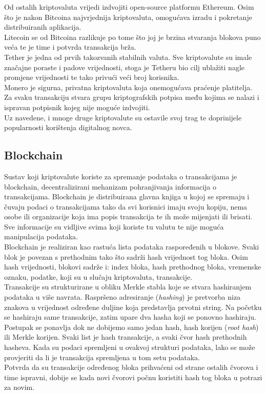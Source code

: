 \documentclass[12pt]{article}
\begin{document}
Od ostalih kriptovaluta vrijedi izdvojiti open-source platformu Ethereum. Osim što je nakon Bitcoina najvrjednija kriptovaluta, omogućava izradu i pokretanje distribuiranih aplikacija.\cite{ethereum} \\
Litecoin se od Bitcoina razlikuje po tome što joj je brzina stvaranja blokova puno veća te je time i potvrda transakcija brža. \cite{litecoin} \\
Tether je jedna od prvih takozvanih stabilnih valuta. Sve kriptovalute su imale značajne poraste i padove vrijednosti, stoga je Tetheru bio cilj ublažiti nagle promjene vrijednosti te tako privući veći broj korisnika.\cite{tether}\\
Monero je sigurna, privatna kriptovaluta koja onemogućava praćenje platitelja. Za svaku transakciju stvara grupu kriptografskih potpisa među kojima se nalazi i ispravan potpisnik kojeg nije moguće izdvojiti.\cite{monero}\\
Uz navedene, i mnoge druge kriptovalute su ostavile svoj trag te doprinijele popularnosti korištenja digitalnog novca.


\subsection{Blockchain}
Sustav koji kriptovalute koriste za spremanje podataka o transakcijama je blockchain, decentralizirani mehanizam pohranjivanja informacija o transakcijama. Blockchain je distribuirana glavna knjiga u kojoj se spremaju i čuvaju podaci o transakcijama tako da svi korisnici imaju svoju kopiju, nema osobe ili organizacije koja ima popis transakcija te ih može mijenjati ili brisati. Sve informacije su vidljive svima koji koriste tu valutu te nije moguća manipulacija podataka. \\
Blockchain je realiziran kao rastuća lista podataka raspoređenih u blokove. Svaki blok je povezan s prethodnim tako što sadrži hash vrijednost tog bloka. Osim hash vrijednosti, blokovi sadrže i: index bloka, hash prethodnog bloka, vremenske oznaku, podatke, koji su u slučaju
kriptovaluta, transakcije. \\

Transakcije su strukturirane u obliku Merkle stabla koje se stvara hashiranjem podataka u više navrata. Raspršeno adresiranje (\textit{hashing}) je pretvorba niza znakova u vrijednost određene duljine koja predstavlja prvotni string. Na početku se hashiraju same transakcije, zatim upare dva hasha koji se ponovno hashiraju.
Postupak se ponavlja dok ne dobijemo samo jedan hash, hash korijen (\textit{root hash}) ili  Merkle korijen. Svaki list je hash transakcije, a svaki čvor hash prethodnih hasheva. Kada su podaci spremljeni u ovakvoj strukturi podataka, lako se može provjeriti da li je transakcija spremljena u tom setu podataka. \\
Potvrda da su transakcije određenog bloka prihvaćeni od strane ostalih čvorova i time ispravni, dobije se kada novi čvorovi počnu koristiti hash tog bloka u potrazi za novim.
\end{document}
